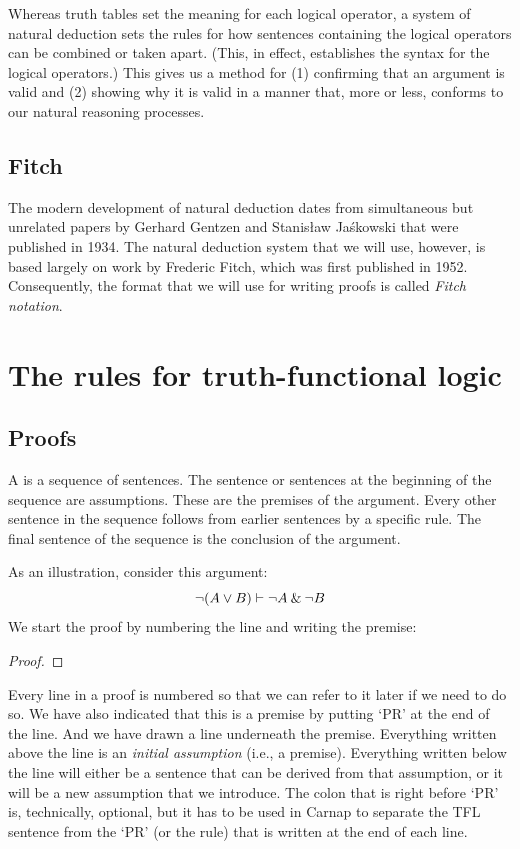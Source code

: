 Whereas truth tables set the meaning for each logical operator, a system of natural deduction sets the rules for how sentences containing the logical operators can be combined or taken apart. (This, in effect, establishes the syntax for the logical operators.) This gives us a method for (1) confirming that an argument is valid and (2) showing why it is valid in a manner that, more or less, conforms to our natural reasoning processes. 



\section{Fitch} The modern development of natural deduction dates from simultaneous but unrelated papers by Gerhard Gentzen and Stanisław Jaśkowski that were published in 1934. The natural deduction system that we will use, however, is based largely on work by Frederic Fitch, which was first published in 1952. Consequently, the format that we will use for writing proofs is called \textit{Fitch notation}.



\chapter{The rules for truth-functional logic}\label{s:BasicTFL}

\section{Proofs}

A  is a sequence of sentences. The sentence or sentences at the beginning of the sequence are assumptions. These are the premises of the argument. Every other sentence in the sequence follows from earlier sentences by a specific rule. The final sentence of the sequence is the conclusion of the argument.

As an illustration, consider this argument:
	$${\neg} (A \vee B) \vdash {\neg} A \mathbin{\&} {\neg} B$$
We start the proof by numbering the line and writing the premise:
\begin{proof}
	 \pr{}
\end{proof}
Every line in a proof is numbered so that we can refer to it later if we need to do so. We have also indicated that this is a premise by putting `PR' at the end of the line. And we have drawn a line underneath the premise. Everything written above the line is an \emph{initial assumption} (i.e., a premise). Everything written below the line will either be a sentence that can be derived from that assumption, or it will be a new assumption that we introduce. The colon that is right before `PR' is, technically, optional, but it has to be used in Carnap to separate the TFL sentence from the `PR' (or the rule) that is written at the end of each line.


